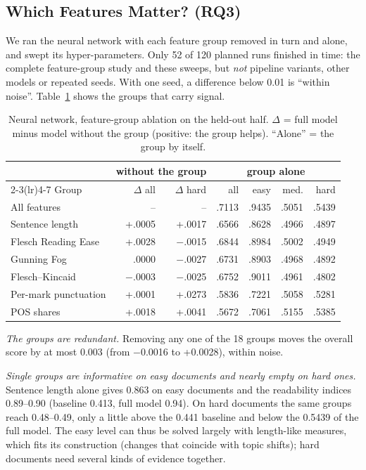 \documentclass[runningheads]{llncs}
\begin{document}
\subsection{Which Features Matter? (RQ3)}
\label{sec:ablation}

We ran the neural network with each feature group removed in turn and alone, and swept its hyper-parameters. Only 52 of 120 planned runs finished in time: the complete feature-group study and these sweeps, but \emph{not} pipeline variants, other models or repeated seeds. With one seed, a difference below 0.01 is ``within noise''. Table~\ref{tab:abl} shows the groups that carry signal.

\begin{table}[t]
\caption{Neural network, feature-group ablation on the held-out half. $\Delta$ = full model minus model without the group (positive: the group helps). ``Alone'' = the group by itself.}
\label{tab:abl}
\centering
\setlength{\tabcolsep}{3.5pt}
\footnotesize
\begin{tabular}{lrrrrrr}
\toprule
 & \multicolumn{2}{c}{without the group} & \multicolumn{4}{c}{group alone}\\
\cmidrule(lr){2-3}\cmidrule(lr){4-7}
Group & $\Delta$ all & $\Delta$ hard & all & easy & med. & hard\\
\midrule
All features & -- & -- & .7113 & .9435 & .5051 & .5439\\
Sentence length & +.0005 & +.0017 & .6566 & .8628 & .4966 & .4897\\
Flesch Reading Ease & +.0028 & $-$.0015 & .6844 & .8984 & .5002 & .4949\\
Gunning Fog & .0000 & $-$.0027 & .6731 & .8903 & .4968 & .4892\\
Flesch--Kincaid & $-$.0003 & $-$.0025 & .6752 & .9011 & .4961 & .4802\\
Per-mark punctuation & +.0001 & +.0273 & .5836 & .7221 & .5058 & .5281\\
POS shares & +.0018 & +.0041 & .5672 & .7061 & .5155 & .5385\\
\bottomrule
\end{tabular}
\end{table}

\emph{The groups are redundant.} Removing any one of the 18 groups moves the overall score by at most 0.003 (from $-$0.0016 to +0.0028), within noise.

\emph{Single groups are informative on easy documents and nearly empty on hard ones.} Sentence length alone gives 0.863 on easy documents and the readability indices 0.89--0.90 (baseline 0.413, full model 0.94). On hard documents the same groups reach 0.48--0.49, only a little above the 0.441 baseline and below the 0.5439 of the full model. The easy level can thus be solved largely with length-like measures, which fits its construction (changes that coincide with topic shifts); hard documents need several kinds of evidence together.
\end{document}
